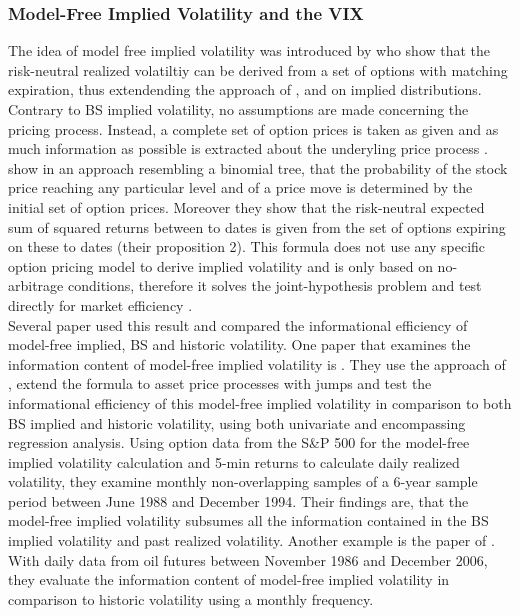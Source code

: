 \subsubsection{Model-Free Implied Volatility and the VIX}\label{sec:223VIX}
The idea of model free implied volatility was introduced by \textcite{britten2000} who show that the risk-neutral realized volatiltiy can be derived from a set of options with matching expiration, thus extendending the approach of \textcite{derman1994} \textcite{dupire1994}, \textcite{dupire1997} and \textcite{rubinstein1994} on implied distributions. Contrary to \ac{BS} implied volatility, no assumptions are made concerning the pricing process. Instead, a complete set of option prices is taken as given and as much information as possible is extracted about the underyling price process \parencite{britten2000}. \\
\textcite{britten2000} show in an approach resembling a binomial tree, that the probability of the stock price reaching any particular level and of a price move is determined by the initial set of option prices. Moreover they show that the risk-neutral expected sum of squared returns between to dates is given from the set of options expiring on these to dates (their proposition 2). This formula does not use any specific option pricing model to derive implied volatility and is only based on no-arbitrage conditions, therefore it solves the joint-hypothesis problem and test directly for market efficiency \parencite{jiang2003}.  \\
Several paper used this result and compared the informational efficiency of model-free implied, \ac{BS} and historic volatility. One paper that examines the information content of model-free implied volatility is \textcite{jiang2003}. They use the approach of \textcite{britten2000}, extend the formula to asset price processes with jumps and test the informational efficiency of this model-free implied volatility in comparison to both \ac{BS} implied and historic volatility, using both univariate and encompassing regression analysis. Using option data from the S\&P 500 for the model-free implied volatility calculation and 5-min returns to calculate daily realized volatility, they examine monthly non-overlapping samples of a 6-year sample period between June 1988 and December 1994. Their findings are, that the model-free implied volatility subsumes all the information contained in the \ac{BS} implied volatility and past realized volatility. Another example is the paper of \textcite{bakanova2010}. With daily data from oil futures between November 1986 and December 2006, they evaluate the information content of model-free implied volatility in comparison to historic volatility using a monthly frequency. 

